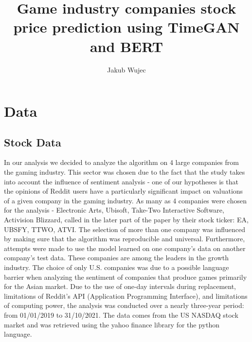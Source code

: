 \documentclass[11pt]{article} %
\title{Game industry companies stock price prediction using TimeGAN and BERT}
\author{Jakub Wujec}
\begin{document}
\maketitle

\section{Data}
\subsection{Stock Data}
In our analysis we decided to analyze the algorithm on 4 large companies from the gaming industry. This sector was chosen due to the fact that the study takes into account the influence of sentiment analysis - one of our hypotheses is that the opinions of Reddit users have a particularly significant impact on valuations of a given company in the gaming industry. As many as 4 companies were chosen for the analysis - Electronic Arts, Ubisoft, Take-Two Interactive Software, Activision Blizzard, called in the later part of the paper by their stock ticker: EA, UBSFY, TTWO, ATVI.  The selection of more than one company was influenced by making sure that the algorithm was reproducible and universal. Furthermore, attempts were made to use the model learned on one company's data on another company's test data. These companies are among the leaders in the growth industry. The choice of only U.S. companies was due to a possible language barrier when analyzing the sentiment of companies that produce games primarily for the Asian market. Due to the use of one-day intervals during replacement, limitations of Reddit's API (Application Programming Interface), and limitations of computing power, the analysis was conducted over a nearly three-year period: from 01/01/2019 to 31/10/2021. The data comes from the US NASDAQ stock market and was retrieved using the yahoo finance library for the python language. 
\end{document}
